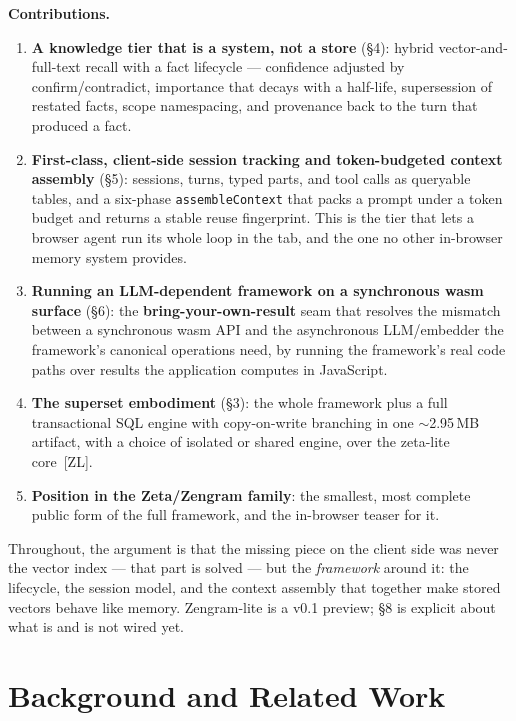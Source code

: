\documentclass[11pt]{article}
\newcommand{\code}[1]{\texttt{#1}}
\begin{document}
\textbf{Contributions.}
\begin{enumerate}[leftmargin=1.4em,itemsep=0.2em]
  \item \textbf{A knowledge tier that is a system, not a store} (\S4): hybrid
    vector-and-full-text recall with a fact lifecycle --- confidence adjusted by
    confirm/contradict, importance that decays with a half-life, supersession of
    restated facts, scope namespacing, and provenance back to the turn that
    produced a fact.
  \item \textbf{First-class, client-side session tracking and token-budgeted
    context assembly} (\S5): sessions, turns, typed parts, and tool calls as
    queryable tables, and a six-phase \code{assembleContext} that packs a prompt
    under a token budget and returns a stable reuse fingerprint. This is the tier
    that lets a browser agent run its whole loop in the tab, and the one no other
    in-browser memory system provides.
  \item \textbf{Running an LLM-dependent framework on a synchronous wasm surface}
    (\S6): the \textbf{bring-your-own-result} seam that resolves the mismatch
    between a synchronous wasm API and the asynchronous LLM/embedder the
    framework's canonical operations need, by running the framework's real code
    paths over results the application computes in JavaScript.
  \item \textbf{The superset embodiment} (\S3): the whole framework plus a full
    transactional SQL engine with copy-on-write branching in one $\sim$2.95\,MB
    artifact, with a choice of isolated or shared engine, over the zeta-lite
    core~[ZL].
  \item \textbf{Position in the Zeta/Zengram family}: the smallest, most complete
    public form of the full framework, and the in-browser teaser for it.
\end{enumerate}

Throughout, the argument is that the missing piece on the client side was never
the vector index --- that part is solved --- but the \emph{framework} around it:
the lifecycle, the session model, and the context assembly that together make
stored vectors behave like memory. Zengram-lite is a v0.1 preview; \S8 is
explicit about what is and is not wired yet.

\section{Background and Related Work}
\end{document}
